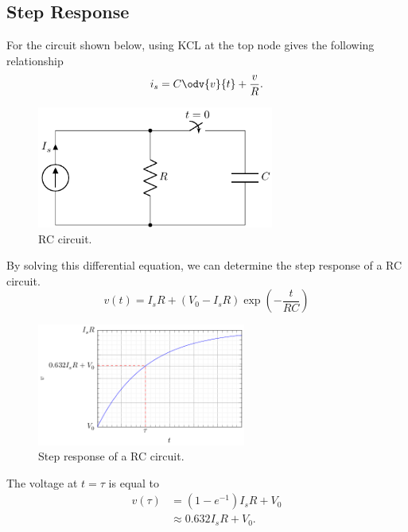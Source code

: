 \documentclass{article}
\begin{document}
\subsection{Step Response}
\begin{definition}
    For the circuit shown below, using KCL at the top node gives the following relationship
    \begin{equation*}
        i_s = C\odv{v}{t} + \frac{v}{R}.
    \end{equation*}
    \begin{figure}[H]
        \centering
        \includegraphics[height = 4cm, keepaspectratio = true]{figures/rc_step.pdf}
        \caption{RC circuit.}
    \end{figure}
    By solving this differential equation, we can determine the step response of a
    RC circuit.
    \begin{equation*}
        v(t) = I_s R + \left(V_0 - I_s R\right) \exp{\left( -\frac{t}{RC} \right)}
    \end{equation*}
    \begin{figure}[H]
        \centering
        \includegraphics[height = 4cm, keepaspectratio = true]{figures/rc_step_plot.pdf}
        \caption{Step response of a RC circuit.}
    \end{figure}
    The voltage at \(t = \tau\) is equal to
    \begin{align*}
        v(\tau) & = \left(1 - e^{-1}\right)I_s R + V_0 \\
                & \approx 0.632I_s R + V_0.
    \end{align*}
\end{definition}
\end{document}
